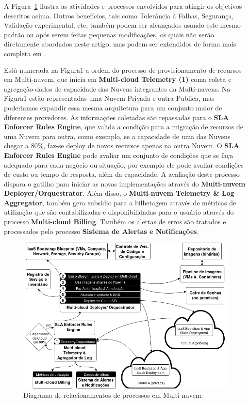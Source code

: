 \documentclass[12pt]{article}
\begin{document}
	A Figura~\ref{fig:figure1} ilustra as atividades e processos envolvidos para atingir os objetivos descritos acima. Outros benefícios, tais como Tolerância à Falhas, Segurança, Validação experimental, etc, também podem ser alcançados usando este mesmo padrão ou após serem feitas pequenas modificações, os quais não serão diretamente abordados neste artigo, mas podem ser entendidos de forma mais completa em \cite{Fisher:2018}.
	
	Está numerada na Figura1 a ordem do processo de provisionamento de recursos em Multi-nuvem, que inicia em \textbf{Multi-cloud Telemetry (1)} coma coleta e agregação dados de capacidade das Nuvens integrantes da Multi-nuvens. Na Figura1 estão representadas uma Nuvem Privada e outra Publica, mas poderiamos expandir essa mesma arquitetura para um conjunto maior de diferentes provedores. As informações coletadas são repassadas para o \textbf{SLA Enforcer Rules Engine}, que valida a condição para a migração de recursos de uma Nuvem para outra, como exemplo, se a capacidade de uma das Nuvens chegar a 80\%, faz-se deploy de novos recursos apenas na outra Nuvem. O \textbf{SLA Enforcer Rules Engine} pode avaliar um conjunto de condições que se faça adequado para cada negócio ou situação, por exemplo ele pode avaliar condições de custo ou tempo de resposta, além da capacidade. A avaliação deste processo dispara o gatilho para iniciar as novas implementações através do \textbf{Multi-nuvem Deployer/Orquestrator}. Além disso, o \textbf{Multi-nuvem Telemetry \& Log Aggregator}, também gera subsídio para a bilhetagem através de métricas de utilização que são contabilizadas e disponibilidadas para o usuário através do processo \textbf{Multi-cloud Billing}. Também os alertas de erros são tratados e processados pelo processo \textbf{Sistema de Alertas e Notificações}.
		
	\begin{figure}[H]
		\centering
		\includegraphics[width=0.9\linewidth]{figuras/Figure1.png}
		\caption{Diagrama de relacionamentos de processos em Multi-nuvem.}
		\label{fig:figure1}
	\end{figure}
\end{document}
